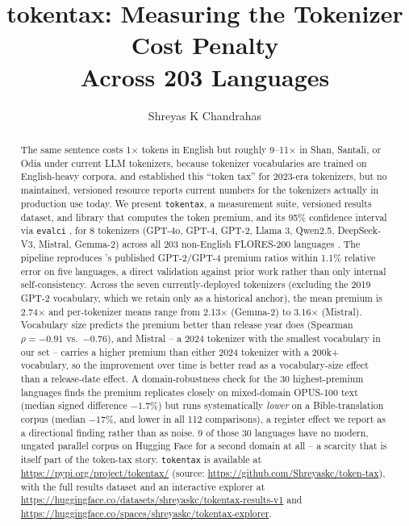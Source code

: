 \documentclass[11pt]{article}
\title{tokentax: Measuring the Tokenizer Cost Penalty\\ Across 203 Languages}
\author{Shreyas K Chandrahas}
\date{}
\begin{document}
\maketitle

\begin{abstract}
The same sentence costs 1$\times$ tokens in English but roughly 9--11$\times$
in Shan, Santali, or Odia under current LLM tokenizers, because tokenizer
vocabularies are trained on English-heavy corpora. \citet{petrov2023} and
\citet{ahia2023} established this ``token tax'' for 2023-era tokenizers, but
no maintained, versioned resource reports current numbers for the tokenizers
actually in production use today. We present \texttt{tokentax}, a
measurement suite, versioned results dataset, and library that computes the
token premium, and its 95\% confidence interval via \texttt{evalci}
\citep{chandrahas2026evalci}, for 8 tokenizers (GPT-4o, GPT-4, GPT-2, Llama
3, Qwen2.5, DeepSeek-V3, Mistral, Gemma-2) across all 203 non-English
FLORES-200 languages \citep{nllbteam2022}. The pipeline reproduces
\citeauthor{petrov2023}'s published GPT-2/GPT-4 premium ratios within 1.1\%
relative error on five languages, a direct validation against prior work
rather than only internal self-consistency. Across the seven
currently-deployed tokenizers (excluding the 2019 GPT-2 vocabulary, which we
retain only as a historical anchor), the mean premium is 2.74$\times$ and
per-tokenizer means range from 2.13$\times$ (Gemma-2) to 3.16$\times$
(Mistral). Vocabulary size predicts the premium better than release year
does (Spearman $\rho=-0.91$ vs.\ $-0.76$), and Mistral -- a 2024 tokenizer
with the smallest vocabulary in our set -- carries a higher premium than
either 2024 tokenizer with a 200k+ vocabulary, so the improvement over time
is better read as a vocabulary-size effect than a release-date effect. A
domain-robustness check for the 30 highest-premium languages finds the
premium replicates closely on mixed-domain OPUS-100 text (median signed
difference $-1.7$\%) but runs systematically \emph{lower} on a
Bible-translation corpus (median $-17$\%, and lower in all 112 comparisons),
a register effect we report as a directional finding rather than as noise. 9
of those 30 languages have no modern, ungated parallel corpus on Hugging
Face for a second domain at all -- a scarcity that is itself part of the
token-tax story.
\texttt{tokentax} is available at \url{https://pypi.org/project/tokentax/}
(source: \url{https://github.com/Shreyaskc/token-tax}), with the full
results dataset and an interactive explorer at
\url{https://huggingface.co/datasets/shreyaskc/tokentax-results-v1} and
\url{https://huggingface.co/spaces/shreyaskc/tokentax-explorer}.
\end{abstract}
\end{document}
